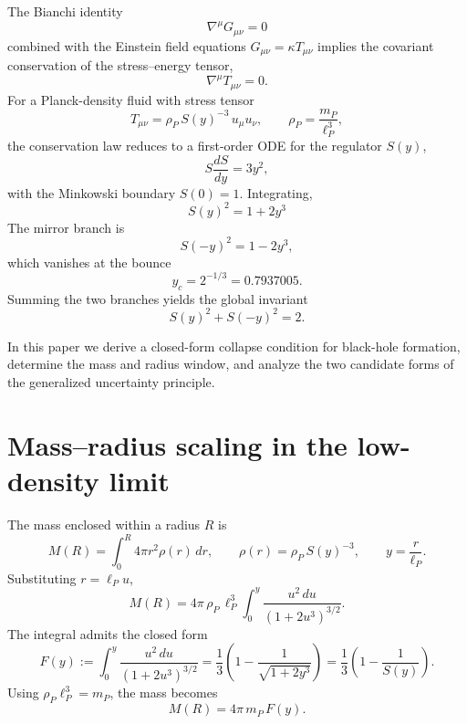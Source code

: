 \documentclass[12pt,oneside,openany]{book}
\begin{document}
The Bianchi identity
\begin{equation}
\nabla^{\mu}G_{\mu\nu}=0
\label{eq:bianchi}
\end{equation}
combined with the Einstein field equations $G_{\mu\nu}=\kappa
T_{\mu\nu}$ implies the covariant conservation of the
stress--energy tensor,
\begin{equation}
\nabla^{\mu}T_{\mu\nu}=0.
\label{eq:conservation}
\end{equation}
For a Planck-density fluid with stress tensor
\begin{equation}
T_{\mu\nu}=\rho_{P}\,S(y)^{-3}\,u_{\mu}u_{\nu},
\qquad
\rho_{P}=\frac{m_{P}}{\ell_{P}^{3}},
\label{eq:stress}
\end{equation}
the conservation law reduces to a first-order ODE for the
regulator $S(y)$,
\begin{equation}
S\frac{dS}{dy}=3y^{2},
\label{eq:ODE}
\end{equation}
with the Minkowski boundary $S(0)=1$. Integrating,
\begin{equation}
\boxed{\;S(y)^{2}=1+2y^{3}\;}
\label{eq:S2}
\end{equation}
The mirror branch is
\begin{equation}
S(-y)^{2}=1-2y^{3},
\label{eq:Smirror}
\end{equation}
which vanishes at the bounce
\begin{equation}
y_{c}=2^{-1/3}=0.7937005.
\label{eq:yc}
\end{equation}
Summing the two branches yields the global invariant
\begin{equation}
\boxed{\;S(y)^{2}+S(-y)^{2}=2.\;}
\label{eq:invariant}
\end{equation}

In this paper we derive a closed-form collapse condition for
black-hole formation, determine the mass and radius window, and
analyze the two candidate forms of the generalized uncertainty
principle.

\section{Mass--radius scaling in the low-density limit}

The mass enclosed within a radius $R$ is
\begin{equation}
M(R)=\int_{0}^{R}4\pi r^{2}\rho(r)\,dr,
\qquad
\rho(r)=\rho_{P}\,S(y)^{-3},
\qquad
y=\frac{r}{\ell_{P}}.
\label{eq:M-integral}
\end{equation}
Substituting $r=\ell_{P}u$,
\begin{equation}
M(R)
=
4\pi\,\rho_{P}\,\ell_{P}^{3}
\int_{0}^{y}\frac{u^{2}\,du}{(1+2u^{3})^{3/2}}.
\label{eq:M-dimless}
\end{equation}
The integral admits the closed form
\begin{equation}
F(y)
:=
\int_{0}^{y}\frac{u^{2}\,du}{(1+2u^{3})^{3/2}}
=
\frac{1}{3}\left(1-\frac{1}{\sqrt{1+2y^{3}}}\right)
=
\frac{1}{3}\left(1-\frac{1}{S(y)}\right).
\label{eq:F-closed}
\end{equation}
Using $\rho_{P}\ell_{P}^{3}=m_{P}$, the mass becomes
\begin{equation}
\boxed{\;M(R)=4\pi\,m_{P}\,F(y).\;}
\label{eq:M-simple}
\end{equation}
\end{document}
